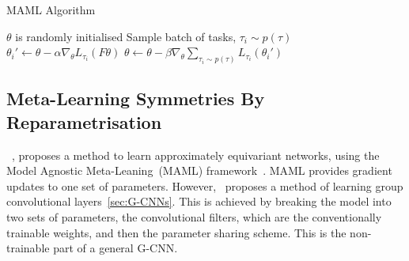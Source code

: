 \begin{algorithm}
	\caption{MAML Algorithm}
	\label{alg:maml}
	\begin{algorithmic}
		\State $\theta$ is randomly initialised
		\State Sample batch of tasks, $\tau_i \sim p(\tau)$
		\State $\theta_i' \leftarrow \theta - \alpha \nabla_\theta L_{\tau_i}(F\theta)$
		\EndFor
		\State $\theta \leftarrow \theta - \beta \nabla_\theta \sum_{\tau_i \sim p(\tau)}{L_{\tau_i}(\theta_i')}$
		\EndWhile
	\end{algorithmic}
\end{algorithm}


\subsection{Meta-Learning Symmetries By Reparametrisation}
~\cite{zhou2020meta}, proposes a method to learn approximately equivariant networks, using the Model Agnostic Meta-Leaning~(MAML) framework~\cite{finn2017model}. MAML provides gradient updates to one set of parameters. However,~\cite{zhou2020meta} proposes a method of learning group convolutional layers~\ref{sec:G-CNNs}. This is achieved by breaking the model into two sets of parameters, the convolutional filters, which are the conventionally trainable weights, and then the parameter sharing scheme. This is the non-trainable part of a general G-CNN.

